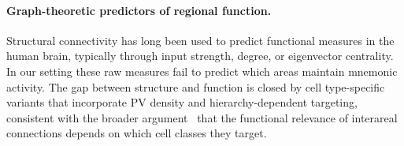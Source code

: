 \paragraph{Graph-theoretic predictors of regional function.}
Structural connectivity has long been used to predict functional measures in the human brain, typically through input strength, degree, or eigenvector centrality. In our setting these raw measures fail to predict which areas maintain mnemonic activity. The gap between structure and function is closed by cell type-specific variants that incorporate PV density and hierarchy-dependent targeting, consistent with the broader argument~\cite{wang2020macroscopic,fulcher2019overlapping} that the functional relevance of interareal connections depends on which cell classes they target.
